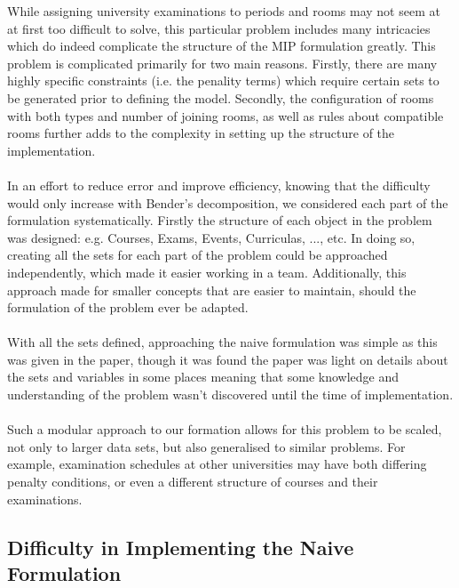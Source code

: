 \documentclass{article}
\begin{document}
While assigning university examinations to periods and rooms may not seem at at first too difficult to solve, this particular problem includes many intricacies which do indeed complicate the structure of the MIP formulation greatly. This problem is complicated primarily for two main reasons. Firstly, there are many highly specific constraints (i.e. the penality terms) which require certain sets to be generated prior to defining the model. Secondly, the configuration of rooms with both types and number of joining rooms, as well as rules about compatible rooms further adds to the complexity in setting up the structure of the implementation. \\
\\
In an effort to reduce error and improve efficiency, knowing that the difficulty would only increase with Bender's decomposition, we considered each part of the formulation systematically. Firstly the structure of each object in the problem was designed: e.g. Courses, Exams, Events, Curriculas, ..., etc. In doing so, creating all the sets for each part of the problem could be approached independently, which made it easier working in a team. Additionally, this approach made for smaller concepts that are easier to maintain, should the formulation of the problem ever be adapted. \\
\\
With all the sets defined, approaching the naive formulation was simple as this was given in the paper, though it was found the paper was light on details about the sets and variables in some places meaning that some knowledge and understanding of the problem wasn't discovered until the time of implementation. \\
\\
Such a modular approach to our formation allows for this problem to be scaled, not only to larger data sets, but also generalised to similar problems. For example, examination schedules at other universities may have both differing penalty conditions, or even a different structure of courses and their examinations. 

\newpage

\subsection{Difficulty in Implementing the Naive Formulation}
\end{document}
